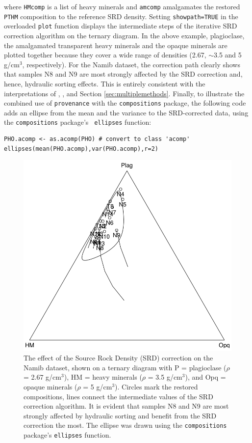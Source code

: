 \documentclass{article}
\begin{document}
where {\tt HMcomp} is a list of heavy minerals and {\tt amcomp}
amalgamates the restored {\tt PTHM} composition to the reference SRD
density. Setting {\tt showpath=TRUE} in the overloaded {\tt plot}
function displays the intermediate steps of the iterative SRD
correction algorithm on the ternary diagram. In the above example,
plagioclase, the amalgamated transparent heavy minerals and the opaque
minerals are plotted together because they cover a wide range of
densities (2.67, $\sim$3.5 and 5 g/cm$^3$, respectively). For the
Namib dataset, the correction path clearly shows that samples N8 and
N9 are most strongly affected by the SRD correction and, hence,
hydraulic sorting effects.  This is entirely consistent with the
interpretations of \citet{garzanti2012}, \citet{vermeesch2015}, and
Section \ref{sec:multiplemethods}. Finally, to illustrate the combined
use of {\tt provenance} with the {\tt compositions} package, the
following code adds an ellipse from the mean and the variance to the
SRD-corrected data, using the {\tt compositions} package's {\tt
  ellipses} function:

\begin{verbatim}
PHO.acomp <- as.acomp(PHO) # convert to class 'acomp'
ellipses(mean(PHO.acomp),var(PHO.acomp),r=2)
\end{verbatim}

\begin{figure}
\centering
\includegraphics[width=.7\textwidth]{srd.png}
\caption{The effect of the Source Rock Density (SRD) correction on the
  Namib dataset, shown on a ternary diagram with P = plagioclase
  ($\rho$ = 2.67 g/cm$^3$), HM = heavy minerals ($\rho$ = 3.5
  g/cm$^3$), and Opq = opaque minerals ($\rho$ = 5 g/cm$^3$). Circles
  mark the restored compositions, lines connect the intermediate
  values of the SRD correction algorithm. It is evident that samples
  N8 and N9 are most strongly affected by hydraulic sorting and
  benefit from the SRD correction the most. The ellipse was drawn
  using the {\tt compositions} package's {\tt ellipses} function.}
\label{fig:srd}
\end{figure}
\end{document}
